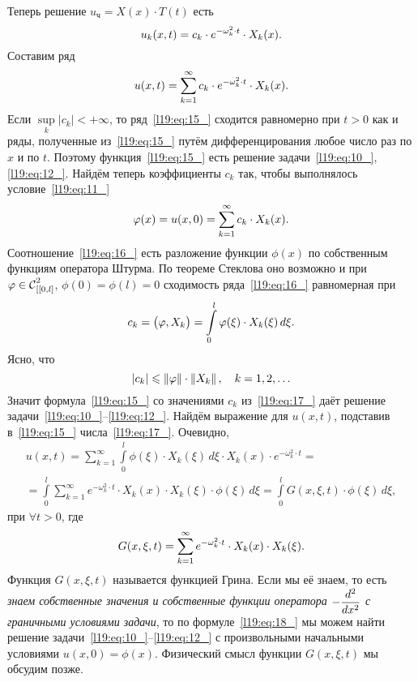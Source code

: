 Теперь решение $u_{\text{ч}}=X(x)\cdot T(t)$ есть 
\begin{equation*}
	\hfill u_k(x,t)=c_k\cdot e^{-\omega_k^2\cdot t}\cdot X_k(x).\hfill
\end{equation*}
Составим ряд
\begin{equation}\label{l19:eq:15_}
	\hfill u(x,t)=\sum\limits_{k=1}^{\infty}c_k\cdot e^{-\omega_k^2\cdot t}\cdot X_k(x).\hfill
\end{equation}
Если $\sup\limits_k|c_k|<+\infty$, то ряд~\eqref{l19:eq:15_} сходится равномерно при $t>0$ как и ряды, полученные из~\eqref{l19:eq:15_} путём дифференцирования любое число раз по $x$ и по $t$. Поэтому функция~\eqref{l19:eq:15_} есть решение задачи~\eqref{l19:eq:10_}, \eqref{l19:eq:12_}. Найдём теперь коэффициенты $c_k$ так, чтобы выполнялось условие~\eqref{l19:eq:11_}
\begin{equation}\label{l19:eq:16_}
	\hfill\phi(x)=u(x,0)=\sum\limits_{k=1}^{\infty}c_k\cdot X_k(x).\hfill
\end{equation} 
Соотношение~\eqref{l19:eq:16_} есть разложение функции $\phi(x)$ по собственным функциям оператора Штурма. По теореме Стеклова оно возможно и при $\phi\in\Cfn[[{[0,l]}]{2}$, $\phi(0)=\phi(l)=0$ сходимость ряда~\eqref{l19:eq:16_} равномерная при
\begin{equation}\label{l19:eq:17_}
	\hfill c_k=\big(\phi, X_k\big)=\int\limits_0^l\phi(\xi)\cdot X_k(\xi)\,d\xi.\hfill
\end{equation} 
Ясно, что 
\begin{equation*}
	\hfill |c_k|\leqslant\norm{\phi}\cdot\norm{X_k},\quad k=1,2,\ldots\hfill
\end{equation*}
Значит формула~\eqref{l19:eq:15_} со значениями $c_k$ из~\eqref{l19:eq:17_} даёт решение задачи~\eqref{l19:eq:10_}--\eqref{l19:eq:12_}. Найдём выражение для $u(x,t)$,  подставив в~\eqref{l19:eq:15_} числа~\eqref{l19:eq:17_}. Очевидно,
\begin{multline}\label{l19:eq:18_}
	u(x,t)=\sum\limits_{k=1}^{\infty}\int\limits_0^l\phi(\xi)\cdot X_k(\xi)\,d\xi\cdot X_k(x)\cdot e^{-\omega_k^2\cdot t}=\\
	=\int\limits_0^l\sum\limits_{k=1}^{\infty}e^{-\omega_k^2\cdot t}\cdot X_k(x)\cdot X_k(\xi)\cdot\phi(\xi)\,d\xi=\int\limits_0^l G(x,\xi,t)\cdot\phi(\xi)\,d\xi,
\end{multline}
при $\forall t>0$, где 
\begin{equation}\label{l19:eq:19_}
	\hfill G(x,\xi,t)=\sum\limits_{k=1}^{\infty}e^{-\omega_k^2\cdot t}\cdot X_k(x)\cdot X_k(\xi).\hfill
\end{equation}
Функция $G(x,\xi,t)$ называется функцией Грина. Если мы её знаем, то есть \emph{знаем собственные значения и собственные функции оператора $\displaystyle-\dder{}{x}$ с граничными условиями задачи}, то по формуле~\eqref{l19:eq:18_} мы можем найти решение задачи~\eqref{l19:eq:10_}--\eqref{l19:eq:12_} с произвольными начальными условиями $u(x,0)=\phi(x)$. Физический смысл функции $G(x,\xi,t)$ мы обсудим позже. 

